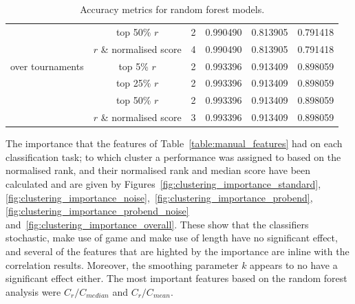 \documentclass{article}
\newcommand{\numberofalltournaments}{}
\begin{document}
\begin{table}[!htbp]
\begin{center}
{\begin{tabular}{lccccc}
                               & top 50\% $r$             & 2 & 0.990490  & 0.813905 & 0.791418\\
                               & $r$  \& normalised score & 4 & 0.990490  & 0.813905 & 0.791418\\
    \midrule
    over \numberofalltournaments tournaments & top 5\% $r$               & 2 & 0.993396 & 0.913409 & 0.898059 \\
                                             & top 25\% $r$              & 2 & 0.993396 & 0.913409 & 0.898059 \\
                                             & top 50\% $r$              & 2 & 0.993396 & 0.913409 & 0.898059 \\
                                             & $r$  \& normalised score  & 3 & 0.993396 & 0.913409 & 0.898059 \\
    \bottomrule
        \end{tabular}}
    \end{center}
    \caption{Accuracy metrics for random forest models.}
    \label{table:accuracy_random_forest}
\end{table}

The importance that the features of Table~\ref{table:manual_features} had on
each classification task; to which cluster a performance was assigned to based
on the normalised rank, and their normalised rank and median score have been
calculated and are given by Figures~\ref{fig:clustering_importance_standard},
\ref{fig:clustering_importance_noise},~\ref{fig:clustering_importance_probend},
\ref{fig:clustering_importance_probend_noise}
and~\ref{fig:clustering_importance_overall}. These show that the classifiers
stochastic, make use of game and make use of length have no significant effect,
and several of the features that are highted by the importance are inline with
the correlation results. Moreover, the smoothing parameter \(k\) appears to no
have a significant effect either. The most important features based on the
random forest analysis were $C_{r} / C_{median}$ and $C_r / C_{mean}$.
\end{document}
